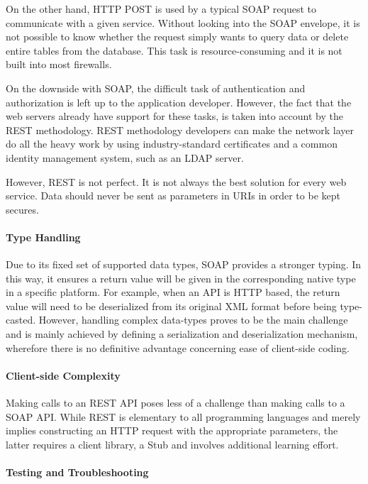 On the other hand, HTTP POST is used by a typical SOAP request to communicate with a given service. Without looking into the SOAP envelope, it is not possible to know whether the request simply wants to query data or delete entire tables from the database. This task is resource-consuming and it is not built into most firewalls.

On the downside with SOAP, the difficult task of authentication and authorization is left up to the application developer. However, the fact that the web servers already have support for these tasks, is taken into account by the REST methodology. REST methodology developers can make the network layer do all the heavy work by using industry-standard certificates and a common identity management system, such as an LDAP server.

However, REST is not perfect. It is not always the best solution for every web service. Data should never be sent as parameters in URIs in order to be kept secures. 

\paragraph{Type Handling}

Due to its fixed set of supported data types, SOAP provides a stronger typing. In this way, it ensures a return value  will be given in the corresponding native type in a specific platform. For example, when an API is HTTP based, the return value will need to be deserialized from its original XML format before being type-casted.    
However, handling complex data-types proves to be the main challenge and is mainly achieved by defining a serialization and deserialization mechanism, wherefore there is no definitive advantage concerning ease of client-side coding. 


\paragraph{Client-side Complexity}

Making calls to an REST API poses less of a challenge than making calls to a SOAP API. While REST is elementary to all programming languages and merely implies constructing an HTTP request with the appropriate parameters, the latter requires a client library, a Stub and involves additional learning effort.  

\paragraph{Testing and Troubleshooting}

